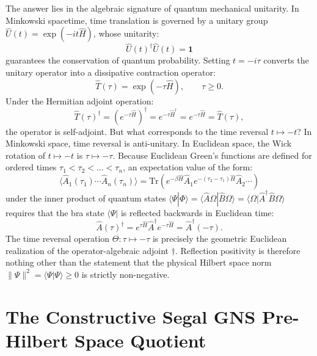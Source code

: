 The answer lies in the algebraic signature of quantum mechanical unitarity. In Minkowski spacetime, time translation is governed by a unitary group $\hat{U}(t) = \exp(-i t \hat{H})$, whose unitarity:
\begin{equation}
\hat{U}(t)^\dagger \hat{U}(t) = \mathbf{1}
\end{equation}
guarantees the conservation of quantum probability. Setting $t = -i \tau$ converts the unitary operator into a dissipative contraction operator:
\begin{equation}
\hat{T}(\tau) = \exp(-\tau \hat{H}), \qquad \tau \ge 0.
\end{equation}
Under the Hermitian adjoint operation:
\begin{equation}
\hat{T}(\tau)^\dagger = \left( e^{-\tau \hat{H}} \right)^\dagger = e^{-\tau \hat{H}^\dagger} = e^{-\tau \hat{H}} = \hat{T}(\tau),
\end{equation}
the operator is self-adjoint. But what corresponds to the time reversal $t \mapsto -t$? In Minkowski space, time reversal is anti-unitary. In Euclidean space, the Wick rotation of $t \mapsto -t$ is $\tau \mapsto -\tau$. Because Euclidean Green's functions are defined for ordered times $\tau_1 < \tau_2 < \dots < \tau_n$, an expectation value of the form:
\begin{equation}
\langle \hat{A}_1(\tau_1) \cdots \hat{A}_n(\tau_n) \rangle = \mathrm{Tr}\left( e^{-\beta \hat{H}} \hat{A}_1 e^{-(\tau_2 - \tau_1)\hat{H}} \hat{A}_2 \cdots \right)
\end{equation}
under the inner product of quantum states $\langle \Psi | \Phi \rangle = \langle \hat{A} \Omega | \hat{B} \Omega \rangle = \langle \Omega | \hat{A}^\dagger \hat{B} \Omega \rangle$ requires that the bra state $\langle \Psi |$ is reflected backwards in Euclidean time:
\begin{equation}
\hat{A}(\tau)^\dagger = e^{\tau \hat{H}} \hat{A}^\dagger e^{-\tau \hat{H}} = \hat{A}^\dagger(-\tau).
\end{equation}
The time reversal operation $\Theta : \tau \mapsto -\tau$ is precisely the geometric Euclidean realization of the operator-algebraic adjoint $\dagger$. Reflection positivity is therefore nothing other than the statement that the physical Hilbert space norm $\|\Psi\|^2 = \langle \Psi | \Psi \rangle \ge 0$ is strictly non-negative.

\section{The Constructive Segal GNS Pre-Hilbert Space Quotient}
\label{sec:segal_gns_quotient}


